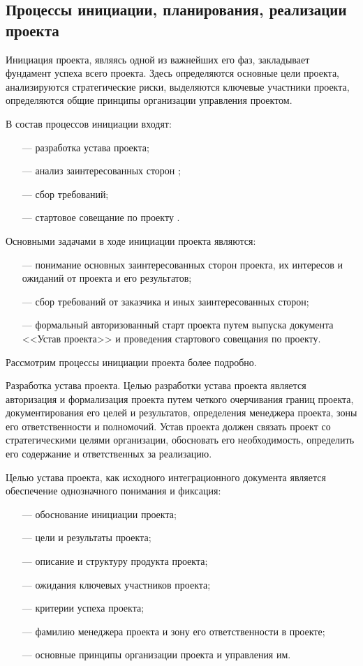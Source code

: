 \subsection{Процессы инициации, планирования, реализации проекта}

Инициация проекта, являясь одной из важнейших его фаз, закладывает фундамент успеха всего проекта.
Здесь определяются основные цели проекта, анализируются стратегические риски, выделяются ключевые участники проекта, определяются общие принципы организации управления проектом.

В состав процессов инициации входят:
\begin{itemize}
	\item [---] разработка устава проекта;
	\item [---] анализ заинтересованных сторон ;
	\item [---] сбор требований;
	\item [---] стартовое совещание по проекту .
\end{itemize}

Основными задачами в ходе инициации проекта являются:
\begin{itemize}
	\item [---]понимание основных заинтересованных сторон проекта, их интере­сов и ожиданий от проекта и его результатов;
	\item [---]сбор требований от заказчика и иных заинтересованных сторон;
	\item [---]формальный авторизованный старт проекта путем выпуска до­кумента <<Устав проекта>> и проведения стартового совещания по
	проекту.
\end{itemize}

Рассмотрим процессы инициации проекта более подробно.

Разработка устава проекта.
Целью разработки устава проекта является авторизация и формализа­ция проекта путем четкого очерчивания границ проекта, документиро­вания его целей и результатов, определения менеджера проекта, зоны его ответственности и полномочий.
Устав проекта должен связать проект со стратегическими целями организации, обосновать его необходимость, определить его содержа­ние и ответственных за реализацию.

Целью устава проекта, как исходного интеграционного документа является обеспечение однозначного понимания и фиксация:
\begin{itemize}
	\item [---] обоснование инициации проекта;
	\item [---] цели и результаты проекта;
	\item [---] описание и структуру продукта проекта;
	\item [---]ожидания ключевых участников проекта;
	\item [---]критерии успеха проекта;
	\item [---]фамилию менеджера проекта и зону его ответственности в проекте;
	\item [---]основные принципы организации проекта и управления им.
\end{itemize}

